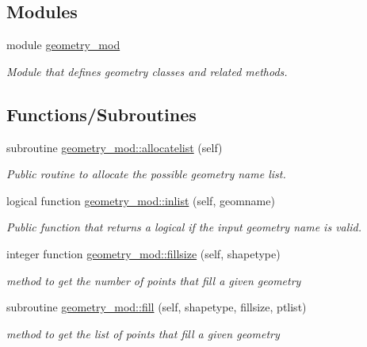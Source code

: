 \subsection*{Modules}
\begin{DoxyCompactItemize}
\item 
module \hyperlink{namespacegeometry__mod}{geometry\+\_\+mod}
\begin{DoxyCompactList}\small\item\em Module that defines geometry classes and related methods. \end{DoxyCompactList}\end{DoxyCompactItemize}
\subsection*{Functions/\+Subroutines}
\begin{DoxyCompactItemize}
\item 
subroutine \hyperlink{namespacegeometry__mod_a1b6f259b0b6be71e02ffae7670f7d8ba}{geometry\+\_\+mod\+::allocatelist} (self)
\begin{DoxyCompactList}\small\item\em Public routine to allocate the possible geometry name list. \end{DoxyCompactList}\item 
logical function \hyperlink{namespacegeometry__mod_a22dd77024fce56da299445a697256155}{geometry\+\_\+mod\+::inlist} (self, geomname)
\begin{DoxyCompactList}\small\item\em Public function that returns a logical if the input geometry name is valid. \end{DoxyCompactList}\item 
integer function \hyperlink{namespacegeometry__mod_a92602e1198d3607613ea2722fb002685}{geometry\+\_\+mod\+::fillsize} (self, shapetype)
\begin{DoxyCompactList}\small\item\em method to get the number of points that fill a given geometry \end{DoxyCompactList}\item 
subroutine \hyperlink{namespacegeometry__mod_a095a8b47b3c23e154dcd31ab1441a065}{geometry\+\_\+mod\+::fill} (self, shapetype, fillsize, ptlist)
\begin{DoxyCompactList}\small\item\em method to get the list of points that fill a given geometry \end{DoxyCompactList}\item 

\end{DoxyCompactItemize}
